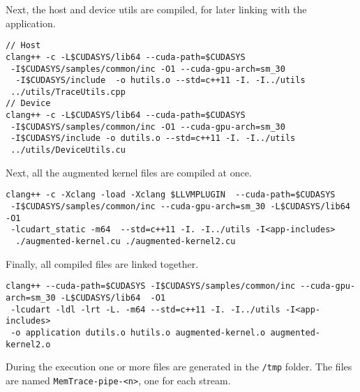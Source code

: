 Next, the host and device utils are compiled, for later linking with the application.
\begin{lstlisting}[style=C]
// Host
clang++ -c -L$CUDASYS/lib64 --cuda-path=$CUDASYS 
 -I$CUDASYS/samples/common/inc -O1 --cuda-gpu-arch=sm_30
  -I$CUDASYS/include  -o hutils.o --std=c++11 -I. -I../utils
 ../utils/TraceUtils.cpp
// Device
clang++ -c -L$CUDASYS/lib64 --cuda-path=$CUDASYS 
 -I$CUDASYS/samples/common/inc -O1 --cuda-gpu-arch=sm_30
 -I$CUDASYS/include -o dutils.o --std=c++11 -I. -I../utils
 ../utils/DeviceUtils.cu
\end{lstlisting}
Next, all the augmented kernel files are compiled at once.
\begin{lstlisting}[style=C]
clang++ -c -Xclang -load -Xclang $LLVMPLUGIN  --cuda-path=$CUDASYS
 -I$CUDASYS/samples/common/inc --cuda-gpu-arch=sm_30 -L$CUDASYS/lib64  -O1
 -lcudart_static -m64  --std=c++11 -I. -I../utils -I<app-includes>
  ./augmented-kernel.cu ./augmented-kernel2.cu
\end{lstlisting}
Finally, all compiled files are linked together.
\begin{lstlisting}[style=C]
clang++ --cuda-path=$CUDASYS -I$CUDASYS/samples/common/inc --cuda-gpu-arch=sm_30 -L$CUDASYS/lib64  -O1
 -lcudart -ldl -lrt -L. -m64 --std=c++11 -I. -I../utils -I<app-includes>
 -o application dutils.o hutils.o augmented-kernel.o augmented-kernel2.o
\end{lstlisting}

During the execution one or more files are generated in the \verb|/tmp| folder. The files are named \verb|MemTrace-pipe-<n>|, one for
each stream.
